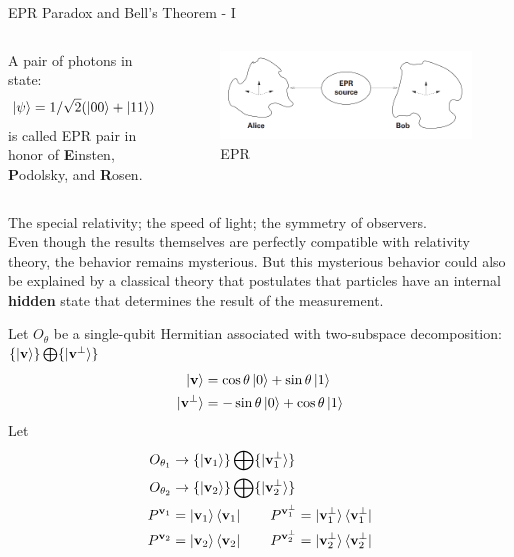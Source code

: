 \documentclass{beamer}
\begin{document}
\begin{frame}{EPR Paradox and Bell's Theorem - I}
  {\tiny
  \begin{columns}
  A pair of photons in state:
  \begin{align*}
    \ket{\psi} = 1/\sqrt2(\ket{00} + \ket{11})
  \end{align*}
  is called EPR pair in honor of \textbf{E}insten, \textbf{P}odolsky, and \textbf{R}osen.

  \begin{figure}
    \includegraphics[scale=0.15]{figures/EPR}
    \caption{EPR}
  \end{figure}
  \end{columns}
  The special relativity; the speed of light; the symmetry of observers. \\
  Even though the results themselves are perfectly compatible with relativity theory, the behavior remains mysterious.
  But this mysterious behavior could also be explained by a classical theory that postulates that
  particles have an internal \textbf{hidden} state that determines the result of the measurement.

  \vspace{0.3cm}
  Let $O_{\theta}$ be a single-qubit Hermitian associated with two-subspace decomposition:
    $\{\ket{\mathbf{v}}\} \bigoplus \{\ket{\mathbf{v}^{\perp}}\}$
  \begin{align*}
    \ket{\mathbf{v}} &= \cos \theta \ket0 + \sin \theta \ket1 \\
    \ket{\mathbf{v}^{\perp}} &= -\sin \theta \ket0 + \cos \theta \ket1
  \end{align*}
  Let
  \begin{align*}
    O_{\theta_{1}} &\rightarrow \{\ket{\mathbf{v}_1}\} \bigoplus \{\ket{\mathbf{v}_1^{\perp}}\} \\
    O_{\theta_{2}} &\rightarrow \{\ket{\mathbf{v}_2}\} \bigoplus \{\ket{\mathbf{v}_2^{\perp}}\} \\
    P^{\mathbf{v}_1} &= \ket{\mathbf{v}_1} \bra{\mathbf{v}_1}
    \qquad
    P^{\mathbf{v}_1^{\perp}} = \ket{\mathbf{v}_1^{\perp}} \bra{\mathbf{v}_1^{\perp}}
    \\
    P^{\mathbf{v}_2} &= \ket{\mathbf{v}_2} \bra{\mathbf{v}_2}
    \qquad
    P^{\mathbf{v}_2^{\perp}} = \ket{\mathbf{v}_2^{\perp}} \bra{\mathbf{v}_2^{\perp}}
  \end{align*}
  }%
\end{frame}
\end{document}
